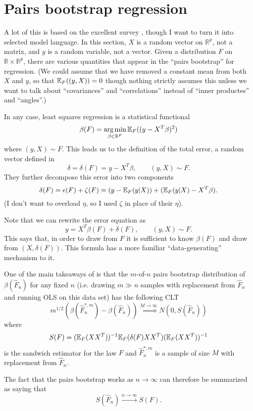\documentclass{article}
\newcommand{\real}{\mathbb{R}}
\begin{document}
\section{Pairs bootstrap regression}

A lot of this is based on the excellent survey \cite{penn_pairs}, though 
I want to turn it into selected model language. In this section,
$X$ is a random vector on $\real^p$, not a matrix, and $y$ is a 
random variable, not a vector. 
Given a distribution $F$ on $\real \times \real^p$, there are various
quantities that appear in the ``pairs bootstrap'' for regression.
(We could assume that we have removed a constant mean
from both $X$ and $y$, so that 
$\mathbb{E}_F((y,X)) = 0$ though nothing strictly assumes this unless
we want to talk about ``covariances'' and ``correlations'' instead
 of ``inner productes'' and ``angles''.)

In any case, least squares regression is a statistical functional
$$
\beta(F) = \argmin_{\beta \in \real^P} \E_F((y-X^T\beta)^2)
$$
where $(y,X) \sim F$.
This leads us to the definition of the total error, a random vector 
defined in \cite{penn_pairs}
$$
\delta = \delta(F) = y - X^T\beta,  \qquad (y, X) \sim F.
$$
They further decompose this error into two components
$$
\delta(F) = \epsilon(F) + \zeta(F) = (y - \mathbb{E}_F(y|X)) + (\mathbb{E}_F(y|X) - X^T\beta).
$$
(I don't want to overload $\eta$, so I used $\zeta$ in place of their $\eta$).

Note that we can rewrite the error equation as
\begin{equation}
\label{eq:datagen:full}
y = X^T\beta(F) +\delta(F), \qquad (y, X) \sim F.
\end{equation}
This says that, in order to draw from $F$ it is sufficient to know 
$\beta(F)$ and draw from $(X, \delta(F))$. This formula
has a more familiar ``data-generating'' mechanism to it.

One of the main takeaways of\cite{penn_pairs} is that the $m$-of-$n$ pairs bootstrap distribution of $\beta(\hat{F}_n)$ for any fixed $n$ (i.e. drawing $m \gg n$ samples with replacement
from $\hat{F}_n$ and running OLS on this data set) 
has the following CLT
$$
m^{1/2} \left(\beta(\hat{F}^{*,m}_n) - \beta(\hat{F}_n) \right)
\overset{M\to \infty}{\Rightarrow} N(0, S(\hat{F}_n))
$$
where 
$$
S(F) = (\mathbb{E}_F(XX^T))^{-1} \mathbb{E}_F(\delta(F)XX^T)(\mathbb{E}_F(XX^T))^{-1}
$$
is the sandwich estimator for the law $F$ and 
$\hat{F}^{*,m}_n$ is a sample of size $M$ with replacement from $\hat{F}_n$.

The fact that the pairs bootstrap works as $n \to \infty$ can therefore be summarized as saying that
$$
S(\hat{F}_n) \overset{n \rightarrow \infty}{\to} S(F).
$$
\end{document}
